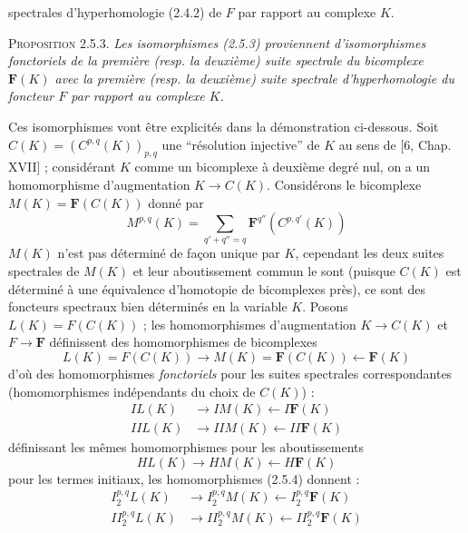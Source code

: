
\noindent spectrales d'hyperhomologie (2.4.2) de $F$ par rapport au complexe
$K$.

\textsc{Proposition 2.5.3.} \textit{Les isomorphismes \textup{(2.5.3)}
proviennent d'isomorphismes fonctoriels de la première \textup{(}resp. la deuxième\textup{)}
suite spectrale du bicomplexe $\mathbf F(K)$ avec la première \textup{(}resp. la
deuxième\textup{)} suite spectrale d'hyperhomologie du foncteur $F$ par rapport au
complexe $K$.}

Ces isomorphismes vont être explicités dans la démonstration ci-dessous. Soit
$C(K)=(C^{p,q}(K))_{p,q}$ une ``résolution injective'' de $K$ au sens de
[6, Chap. XVII] ; considérant $K$ comme un bicomplexe à deuxième degré nul, on
a un homomorphisme d'augmentation $K\to C(K)$. Considérons le
bicomplexe $M(K)=\mathbf F(C(K))$ donné par
\[
M^{p,q}(K)=\sum_{q'+q''=q}\mathbf F^{q''}(C^{p,q'}(K))
\]
$M(K)$ n'est pas déterminé de façon unique par $K$, cependant les deux suites
spectrales de $M(K)$ et leur aboutissement commun le sont (puisque $C(K)$ est
déterminé à une équivalence d'homotopie de bicomplexes près), ce sont des
foncteurs spectraux bien déterminés en la variable $K$. Posons
$L(K)=F(C(K))$ ; les homomorphismes d'augmentation
$K\to C(K)$ et $F\to\mathbf F$ définissent des
homomorphismes de bicomplexes
\[
L(K)=F(C(K))\to M(K)=\mathbf F(C(K))
\leftarrow\mathbf F(K)
\]
d'où des homomorphismes \textit{fonctoriels} pour les suites spectrales
correspondantes (homomorphismes indépendants du choix de $C(K)$) :
\[
\tag{2.5.4}
\begin{aligned}
I L(K)&\to I M(K)\leftarrow I\mathbf F(K)\\
IIL(K)&\to IIM(K)\leftarrow II\mathbf F(K)
\end{aligned}
\]
définissant les mêmes homomorphismes pour les aboutissements
\[
HL(K)\to HM(K)\leftarrow H\mathbf F(K)
\]
pour les termes initiaux, les homomorphismes (2.5.4) donnent :
\[
\tag{2.5.5}
\begin{aligned}
I_2^{p,q}L(K)&\to I_2^{p,q}M(K)
\leftarrow I_2^{p,q}\mathbf F(K)\\
II_2^{p,q}L(K)&\to II_2^{p,q}M(K)
\leftarrow II_2^{p,q}\mathbf F(K)
\end{aligned}
\]
